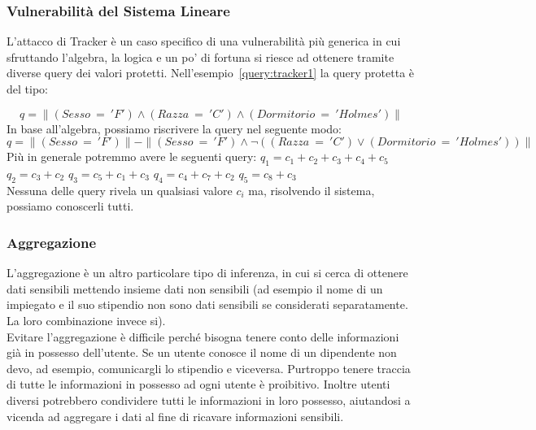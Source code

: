 \subsubsection{Vulnerabilità del Sistema Lineare}
L'attacco di Tracker è un caso specifico di una vulnerabilità più generica in cui sfruttando l'algebra, la logica e un po' di fortuna si riesce ad ottenere tramite diverse query dei valori protetti. Nell'esempio~\ref{query:tracker1} la query protetta è del tipo:

\begin{equation}
q = \parallel (Sesso \: = \: 'F') \wedge (Razza \: = \: 'C') \wedge (Dormitorio \: = \: 'Holmes') \parallel
\end{equation}
In base all'algebra, possiamo riscrivere la query nel seguente modo: 
{\footnotesize
\begin{equation}
q = \parallel (Sesso \: = \: 'F') \parallel - \parallel (Sesso \: = \: 'F') \wedge \neg( (Razza \: = \: 'C') \vee (Dormitorio \: = \: 'Holmes')) \parallel
\end{equation}}
Più in generale potremmo avere le seguenti query:
\newline
\newline
$q_{1} = c_{1} + c_{2} + c_{3} + c_{4} + c_{5}$
\newline
$q_{2} = c_{3} + c_{2} $
\newline
$q_{3} = c_{5} + c_{1} + c_{3}$
\newline
$q_{4} = c_{4} + c_{7} + c_{2}$
\newline
$q_{5} = c_{8} + c_{3}$
\newline
\\
Nessuna delle query rivela un qualsiasi valore $c_{i}$ ma, risolvendo il sistema, possiamo conoscerli tutti.

\subsubsection{Aggregazione}
L'aggregazione è un altro particolare tipo di inferenza, in cui si cerca di ottenere dati sensibili mettendo insieme dati non sensibili (ad esempio il nome di un impiegato e il suo stipendio non sono dati sensibili se considerati separatamente. La loro combinazione invece si). \\

Evitare l'aggregazione è difficile perché bisogna tenere conto delle informazioni già in possesso dell'utente. Se un utente conosce il nome di un dipendente non devo, ad esempio, comunicargli lo stipendio e viceversa. Purtroppo tenere traccia di tutte le informazioni in possesso ad ogni utente è proibitivo. Inoltre utenti diversi potrebbero condividere tutti le informazioni in loro possesso, aiutandosi a vicenda ad aggregare i dati al fine di ricavare informazioni sensibili.


